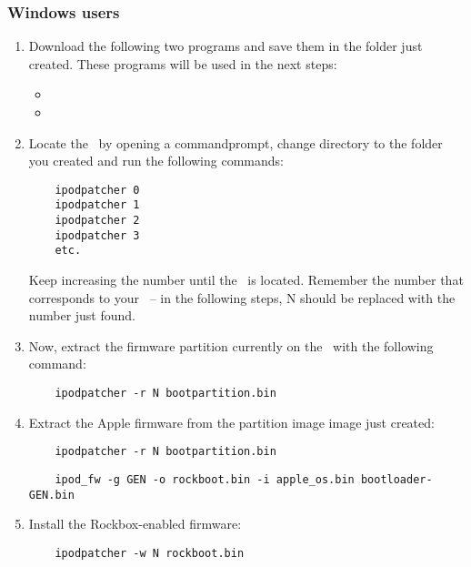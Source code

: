 \subsubsection{Windows users}
\begin{enumerate}
  \item Download the following two programs and save them in the folder just
    created. These programs will be used in the next steps:
    \begin{itemize}
      \item {}
      \item {}
    \end{itemize}
  \item Locate the \dap\ by opening a commandprompt, change directory to the
    folder you created and run the following commands:
    \begin{verbatim}
    ipodpatcher 0
    ipodpatcher 1
    ipodpatcher 2
    ipodpatcher 3
    etc.
    \end{verbatim}
    Keep increasing the number until the \dap\ is located.  Remember the number that corresponds to your \dap\ -- in the 
    following steps, N should be replaced with the number just found.
  \item Now, extract the firmware partition currently on the \dap\  with the
    following command:
    \begin{verbatim}
    ipodpatcher -r N bootpartition.bin
    \end{verbatim}
  \item Extract the Apple firmware from the partition image image just created:
    \begin{verbatim}
    ipodpatcher -r N bootpartition.bin
    \end{verbatim}
    \begin{verbatim}
    ipod_fw -g GEN -o rockboot.bin -i apple_os.bin bootloader-GEN.bin
    \end{verbatim}
  \item
    Install the Rockbox-enabled firmware:
    \begin{verbatim}
    ipodpatcher -w N rockboot.bin
    \end{verbatim}
\end{enumerate}

